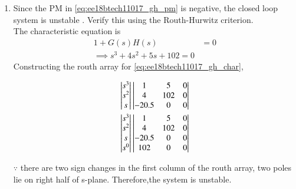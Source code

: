 \begin{enumerate}[label=\thesection.\arabic*.,ref=\thesection.\theenumi]
\begin{figure}[!h]
  \caption{}
  \label{fig:ee18btech11017_2}
\end{figure}
%
\item Since the PM in \eqref{eq:ee18btech11017_gh_pm} is negative, the closed loop system is unstable .
Verify this using the Routh-Hurwitz criterion.
%
\\
\solution 
The characteristic equation is 
\begin{align}
1+G(s)H(s)&=0 
\\
\implies s^{3}+4s^{2}+5s+102=0   
\label{eq:ee18btech11017_gh_char}
\end{align}
Constructing the routh array for \eqref{eq:ee18btech11017_gh_char},

\begin{align}
\begin{vmatrix}s^3\\s^2\\s\end{vmatrix}
\begin{vmatrix}1 & 5 & 0 \\ 4 & 102 & 0 \\ -20.5 & 0 & 0\end{vmatrix}
\\
\begin{vmatrix}s^3\\s^2\\s\\s^0\end{vmatrix}
\begin{vmatrix}1 & 5 & 0 \\ 4 & 102 & 0 \\ -20.5 & 0 & 0 \\ 102 & 0 & 0\end{vmatrix}
\end{align}

$\because $ there are two sign changes in the first column of the routh array,  two  poles lie on right half of s-plane.  Therefore,the system is unstable.


\end{enumerate}

